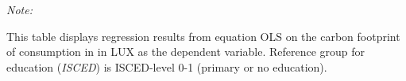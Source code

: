 \begin{table}[htbp!]
\begin{adjustbox}{width = 1\textwidth, max height = 0.95\textheight, center}
\begin{threeparttable}[b]
         \begin{tablenotes}\item \medskip \textit{Note:}
            \item This table displays regression results from equation OLS on the carbon footprint of consumption in  in LUX as the dependent variable.  Reference group for education (\textit{ISCED}) is ISCED-level 0-1 (primary or no education).
         \end{tablenotes}
      \end{threeparttable}
   \end{adjustbox}
\end{table}


